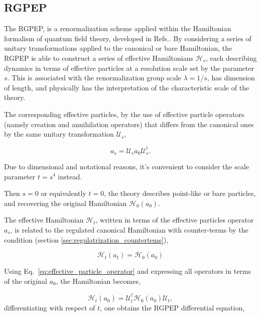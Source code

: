 \documentclass[11pt,a4paper,twoside,pdf]{article}
\numberwithin{equation}{section}
\begin{document}
\subsection{RGPEP}
The RGPEP, is a renormalization scheme applied within the Hamiltonian formalism 
of quantum field theory, developed in Refs.\cite{PhysRevD.48.5863 ,glazek_dynamics_2001, PEP}. By considering a series of unitary transformations applied to the
canonical or bare Hamiltonian, the RGPEP is able to construct a series of effective 
Hamiltonians $\mathcal{H}_s$, each describing dynamics in terms of effective particles 
at a resolution scale set by the parameter \( s \). This is associated with the 
renormalization group scale $\lambda = 1/s$, has dimension of length, and physically 
has the interpretation of the characteristic scale of the theory.

The corresponding effective particles, by the use of effective particle 
operators (namely creation and annihilation operators) that differs from 
the canonical ones by the same unitary transformation $\mathcal{U}_s$,

\begin{equation}
    a_s = \mathcal{U}_sa_0\mathcal{U}_s^\dagger.
    \label{eq:effective_particle_operator}
\end{equation}

Due to dimensional and notational reasons, it's convenient to consider the scale 
parameter $t = s^4$ instead.

Then $s=0$ or equivalently $t=0$, the theory describes  point-like or bare particles, 
and recovering the original Hamiltonian $\mathcal{H}_0(a_0)$.

The effective Hamiltonian $\mathcal{H}_t$, written in terms of the effective particles
operator $a_s$, is related to the regulated canonical Hamiltonian with counter-terms 
by the condition (section \ref{sec:regulatrization_countertems}),

\begin{equation}
    \mathcal{H}_t(a_t) = \mathcal{H}_0(a_0)
\end{equation}

Using Eq.~\eqref{eq:effective_particle_operator} and expressing all operators in 
terms of the original \( a_0 \), the Hamiltonian becomes,

\begin{equation}
    \mathcal{H}_t(a_0) = \mathcal{U}_t^\dagger\mathcal{H}_0(a_0) \mathcal{U}_t,
\end{equation}
differentiating with respect of $t$, one obtains the RGPEP differential equation,
\end{document}

